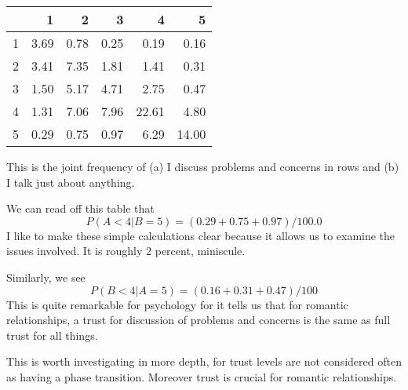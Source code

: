 \documentclass{amsart}
\begin{document}
\begin{table}[ht]
\centering
\begin{tabular}{rrrrrr}
  \hline
 & 1 & 2 & 3 & 4 & 5 \\ 
  \hline
1 & 3.69 & 0.78 & 0.25 & 0.19 & 0.16 \\ 
  2 & 3.41 & 7.35 & 1.81 & 1.41 & 0.31 \\ 
  3 & 1.50 & 5.17 & 4.71 & 2.75 & 0.47 \\ 
  4 & 1.31 & 7.06 & 7.96 & 22.61 & 4.80 \\ 
  5 & 0.29 & 0.75 & 0.97 & 6.29 & 14.00 \\ 
   \hline
\end{tabular}
\end{table}
This is the joint frequency of (a) I discuss problems and concerns in rows and (b) I talk just about anything.

We can read off this table that 
\[
P(A < 4 | B = 5) = (0.29 + 0.75 + 0.97)/100.0
\]  
I like to make these simple calculations clear because it allows us to examine the issues involved.  It is roughly 2 percent, miniscule.

Similarly, we see 
\[
P( B < 4 | A=5) = (0.16 + 0.31 + 0.47)/100
\]
This is quite remarkable for psychology for it tells us that for romantic relationships, a trust for discussion of problems and concerns is the same as full trust for all things.

This is worth investigating in more depth, for trust levels are not considered often as having a phase transition.  Moreover trust is crucial for romantic relationships.
\end{document}
